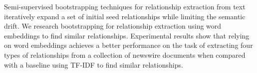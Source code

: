Semi-supervised bootstrapping techniques for relationship extraction from text iteratively expand a set of initial seed relationships while limiting the semantic drift. We research bootstrapping for relationship extraction using word embeddings to find similar relationships. Experimental results show that relying on word embeddings achieves a better performance on the task of extracting four types of relationships from a collection of newswire documents when compared with a baseline using TF-IDF to find similar relationships.
